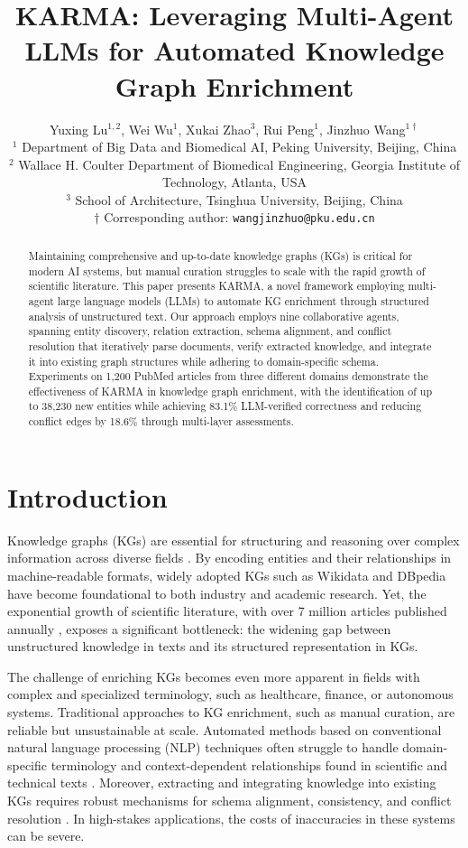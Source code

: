 \documentclass{article}
\title{KARMA: Leveraging Multi-Agent LLMs for Automated Knowledge Graph Enrichment}
\author{
Yuxing Lu$^{1,2}$, 
Wei Wu$^{1}$, 
Xukai Zhao$^{3}$, 
Rui Peng$^{1}$, 
Jinzhuo Wang$^{1\dagger}$\\[6pt]
\small $^{1}$ Department of Big Data and Biomedical AI, Peking University, Beijing, China\\
\small $^{2}$ Wallace H. Coulter Department of Biomedical Engineering, Georgia Institute of Technology, Atlanta, USA\\
\small $^{3}$ School of Architecture, Tsinghua University, Beijing, China\\[4pt] 
$\dagger$ Corresponding author: \texttt{wangjinzhuo@pku.edu.cn}
}
\begin{document}
\maketitle


\begin{abstract}
Maintaining comprehensive and up-to-date knowledge graphs (KGs) is critical for modern AI systems, but manual curation struggles to scale with the rapid growth of scientific literature. This paper presents KARMA, a novel framework employing multi-agent large language models (LLMs) to automate KG enrichment through structured analysis of unstructured text. Our approach employs nine collaborative agents, spanning entity discovery, relation extraction, schema alignment, and conflict resolution that iteratively parse documents, verify extracted knowledge, and integrate it into existing graph structures while adhering to domain-specific schema. Experiments on 1,200 PubMed articles from three different domains demonstrate the effectiveness of KARMA in knowledge graph enrichment, with the identification of up to 38,230 new entities while achieving 83.1\% LLM-verified correctness and reducing conflict edges by 18.6\% through multi-layer assessments.
\end{abstract}


\section{Introduction}
Knowledge graphs (KGs) are essential for structuring and reasoning over complex information across diverse fields \cite{hogan2021knowledge, ji2021survey, lu2025biomedical,lu2025knowledge}. By encoding entities and their relationships in machine-readable formats, widely adopted KGs such as Wikidata \cite{vrandevcic2014wikidata} and DBpedia \cite{lehmann2015contentious} have become foundational to both industry and academic research. Yet, the exponential growth of scientific literature, with over 7 million articles published annually \cite{bornmann2021growth}, exposes a significant bottleneck: the widening gap between unstructured knowledge in texts and its structured representation in KGs.

The challenge of enriching KGs becomes even more apparent in fields with complex and specialized terminology, such as healthcare, finance, or autonomous systems. Traditional approaches to KG enrichment, such as manual curation, are reliable but unsustainable at scale. Automated methods based on conventional natural language processing (NLP) techniques often struggle to handle domain-specific terminology and context-dependent relationships found in scientific and technical texts \cite{nasar2018information}. Moreover, extracting and integrating knowledge into existing KGs requires robust mechanisms for schema alignment, consistency, and conflict resolution \cite{euzenat2007ontology}. In high-stakes applications, the costs of inaccuracies in these systems can be severe.
\end{document}
